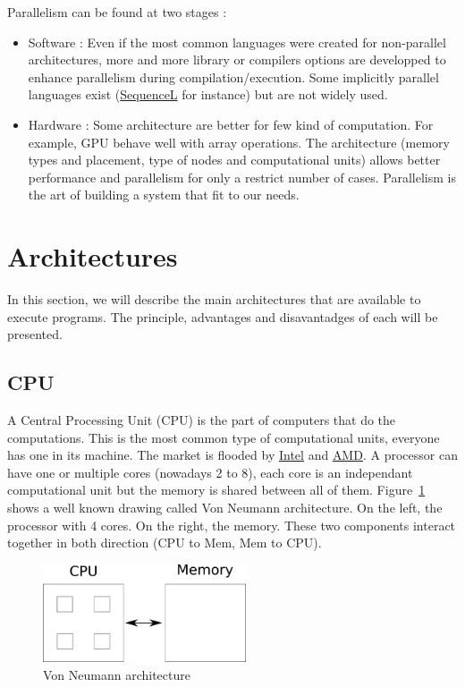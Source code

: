 Parallelism can be found at two stages :
\begin{itemize}
\item Software : Even if the most common languages were created for non-parallel architectures, more and more library or compilers options are developped to enhance parallelism during compilation/execution. Some implicitly parallel languages exist (\href{https://texasmulticore.com/technology/sequencel-at-a-glance/}{SequenceL} for instance) but are not widely used.
\item Hardware : Some architecture are better for few kind of computation. For example, GPU behave well with array operations. The architecture (memory types and placement, type of nodes and computational units) allows better performance and parallelism  for only a restrict number of cases. Parallelism is the art of building a system that fit to our needs.
\end{itemize}

\section{Architectures}
In this section, we will describe the main architectures that are available to execute programs. The principle, advantages and disavantadges of each will be presented.

\subsection{CPU}
A Central Processing Unit (CPU) is the part of computers that do the computations. This is the most common type of computational units, everyone has one in its machine. The market is flooded  by \href{www.intel.com}{Intel} and \href{www.amd.com}{AMD}. A processor can have one or multiple cores (nowadays 2 to 8), each core is an independant computational unit but the memory is shared between all of them. Figure~\ref{fig:VonNeumann} shows a well known drawing called Von Neumann architecture. On the left, the processor with 4 cores. On the right, the memory. These two components interact together in both direction (CPU to Mem, Mem to CPU).
\begin{figure}
\centering
\includegraphics[width=6cm]{gfx/Parallelism/VonNeumann.png}
\caption{Von Neumann architecture}
\label{fig:VonNeumann}
\end{figure}

